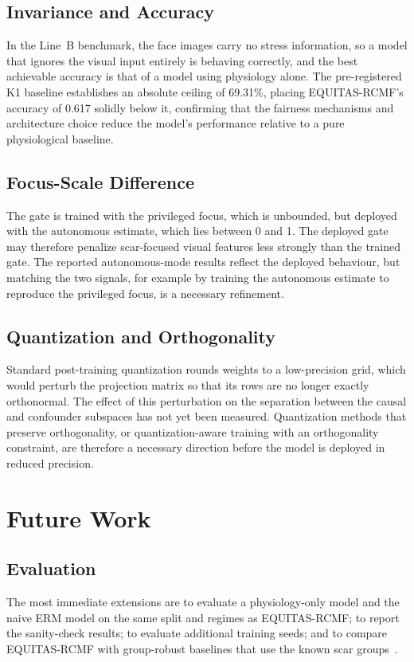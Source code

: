 \subsection{Invariance and Accuracy}
In the Line~B benchmark, the face images carry no stress information, so a model that ignores the visual input entirely is behaving correctly, and the best achievable accuracy is that of a model using physiology alone. The pre-registered K1 baseline establishes an absolute ceiling of 69.31\%, placing EQUITAS-RCMF's accuracy of 0.617 solidly below it, confirming that the fairness mechanisms and architecture choice reduce the model's performance relative to a pure physiological baseline.

\subsection{Focus-Scale Difference}
The gate is trained with the privileged focus, which is unbounded, but deployed with the autonomous estimate, which lies between 0 and 1. The deployed gate may therefore penalize scar-focused visual features less strongly than the trained gate. The reported autonomous-mode results reflect the deployed behaviour, but matching the two signals, for example by training the autonomous estimate to reproduce the privileged focus, is a necessary refinement.

\subsection{Quantization and Orthogonality}
Standard post-training quantization rounds weights to a low-precision grid, which would perturb the projection matrix so that its rows are no longer exactly orthonormal. The effect of this perturbation on the separation between the causal and confounder subspaces has not yet been measured. Quantization methods that preserve orthogonality, or quantization-aware training with an orthogonality constraint, are therefore a necessary direction before the model is deployed in reduced precision.

\section{Future Work}
\subsection{Evaluation}
The most immediate extensions are to evaluate a physiology-only model and the naive ERM model on the same split and regimes as EQUITAS-RCMF; to report the sanity-check results; to evaluate additional training seeds; and to compare EQUITAS-RCMF with group-robust baselines that use the known scar groups~\cite{sagawa2020}.

